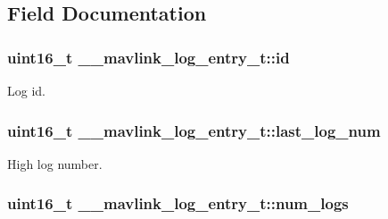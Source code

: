 \subsection{Field Documentation}
\hypertarget{struct____mavlink__log__entry__t_a59a5f04a6bba67c6dabf509d9822a623}{
\subsubsection[{id}]{\setlength{\rightskip}{0pt plus 5cm}uint16\+\_\+t \+\_\+\+\_\+mavlink\+\_\+log\+\_\+entry\+\_\+t\+::id}}\label{struct____mavlink__log__entry__t_a59a5f04a6bba67c6dabf509d9822a623}


Log id. 

\hypertarget{struct____mavlink__log__entry__t_a11af2e1637583c1956d105e6694849d1}{
\subsubsection[{last\+\_\+log\+\_\+num}]{\setlength{\rightskip}{0pt plus 5cm}uint16\+\_\+t \+\_\+\+\_\+mavlink\+\_\+log\+\_\+entry\+\_\+t\+::last\+\_\+log\+\_\+num}}\label{struct____mavlink__log__entry__t_a11af2e1637583c1956d105e6694849d1}


High log number. 

\hypertarget{struct____mavlink__log__entry__t_a6b27aca7e938d8db84eac6f10aebd679}{
\subsubsection[{num\+\_\+logs}]{\setlength{\rightskip}{0pt plus 5cm}uint16\+\_\+t \+\_\+\+\_\+mavlink\+\_\+log\+\_\+entry\+\_\+t\+::num\+\_\+logs}}\label{struct____mavlink__log__entry__t_a6b27aca7e938d8db84eac6f10aebd679}


